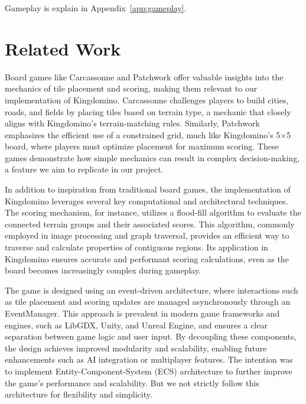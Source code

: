 \documentclass[conference]{IEEEtran}
\begin{document}
Gameplay is explain in Appendix~\ref{app:gameplay}.

\section{Related Work}
\label{sec:related_work}
Board games like Carcassonne\cite{wiki:carcassonne} and
Patchwork\cite{wiki:patchwork} offer valuable insights into the mechanics of
tile placement and scoring, making them relevant to our implementation of
Kingdomino. Carcassonne challenges players to build cities, roads, and fields
by placing tiles based on terrain type, a mechanic that closely aligns with
Kingdomino’s terrain-matching rules. Similarly, Patchwork emphasizes the
efficient use of a constrained grid, much like Kingdomino’s 5×5 board, where
players must optimize placement for maximum scoring. These games demonstrate
how simple mechanics can result in complex decision-making, a feature we aim to
replicate in our project.

In addition to inspiration from traditional board games, the implementation of
Kingdomino leverages several key computational and architectural techniques.
The scoring mechanism, for instance, utilizes a flood-fill
algorithm\cite{wiki:floodfill} to evaluate the connected terrain groups and
their associated scores. This algorithm, commonly employed in image processing
and graph traversal\cite{wiki:graphtraversal}, provides an efficient way to
traverse and calculate properties of contiguous regions. Its application in
Kingdomino ensures accurate and performant scoring calculations, even as the
board becomes increasingly complex during gameplay.

The game is designed using an event-driven architecture\cite{wiki:eventdriven,
    wiki:floodfill}, where interactions such as tile placement
and scoring updates are managed asynchronously through an EventManager. This
approach is prevalent in modern game frameworks and engines, such as LibGDX,
Unity\cite{unity}, and Unreal Engine\cite{unreal}, and ensures a clear separation between game logic and
user input. By decoupling these components, the design achieves improved
modularity and scalability, enabling future enhancements such as AI integration
or multiplayer features. The intention was to implement Entity-Component-System
(ECS) architecture\cite{wiki:ecs} to further improve the game's performance and
scalability. But we not strictly follow this architecture for flexibility and
simplicity.
\end{document}
